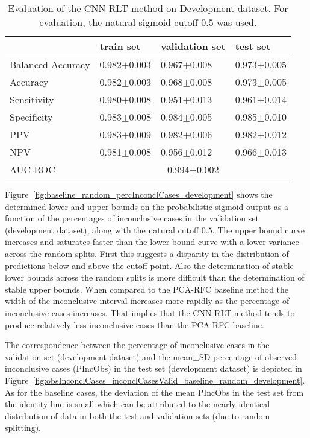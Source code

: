 \begin{table}[ht]
  \caption{Evaluation of the CNN-RLT method on Development dataset. 
  For evaluation, the natural sigmoid cutoff $0.5$ was used.}
  \centering
  \begin{tabular}{llll}
      \hline
                        & train set         & validation set      & test set             \\
      \hline
      Balanced Accuracy & 0.982$\pm$0.003   &  0.967$\pm$0.008    &  0.973$\pm$0.005  \\
      Accuracy          & 0.982$\pm$0.003    &   0.968$\pm$0.008   &  0.973$\pm$0.005  \\
      Sensitivity       &  0.980$\pm$0.008  &   0.951$\pm$0.013  &  0.961$\pm$0.014 \\
      Specificity       &   0.983$\pm$0.008   &   0.984$\pm$0.005  &   0.985$\pm$0.010 \\
      PPV               &  0.983$\pm$0.009   &   0.982$\pm$0.006   &  0.982$\pm$0.012   \\
      NPV               &  0.981$\pm$0.008   &   0.956$\pm$0.012   & 0.966$\pm$0.013  \\
      \hline
      AUC-ROC          &  \multicolumn{3}{c}{0.994$\pm$0.002}  \\
      \hline
  \end{tabular}
 \label{t1:cnn_rlt_perf_eval_table}
\end{table}


Figure~\ref{fig:baseline_random_percInconclCases_development} shows the determined lower and upper bounds on the 
probabilistic sigmoid output as a function of the percentages of inconclusive cases 
in the validation set (development dataset), along with the natural cutoff $0.5$.
The upper bound curve increases and saturates faster than the lower bound curve with a lower variance across 
the random splits.
First this suggests a disparity in the distribution of predictions below and above the cutoff point.
Also the determination of stable lower bounds across the random splits is more difficult
than the determination of stable upper bounds.
When compared to the PCA-RFC baseline method 
the width of the inconclusive interval increases more rapidly as the percentage of inconclusive cases increases.
That implies that the CNN-RLT method tends to produce relatively less inconclusive cases than the PCA-RFC baseline.

The correspondence between the percentage of inconclusive cases in the validation set (development dataset) and 
the mean$\pm$SD percentage of observed inconclusive cases (PIncObs) in the test set (development dataset) 
is depicted in Figure~\ref{fig:obsInconclCases_inconclCasesValid_baseline_random_development}.
As for the baseline cases, the deviation of the mean PIncObs in the test set from the 
identity line is small which can be attributed to the nearly identical distribution of data in both the test and validation sets 
(due to random splitting).


